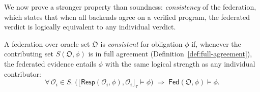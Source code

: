 \documentclass[11pt]{article}
\newcommand{\Oracle}{\mathcal{O}}            %
\newcommand{\OrcSet}{\mathfrak{O}}           %
\newcommand{\Orcl}[1]{\Oracle_{#1}}         %
\newcommand{\Fed}{\mathsf{Fed}}             %
\newcommand{\Ceil}[1]{\lfloor #1 \rfloor_{\tau}}   %
\newcommand{\Resp}{\mathsf{Resp}}           %
\begin{document}
We now prove a stronger property than soundness: \emph{consistency} of
the federation, which states that when all backends agree on a verified
program, the federated verdict is logically equivalent to any individual
verdict.

\begin{definition}\label{def:fed-consistency}
  A federation over oracle set $\OrcSet$ is \emph{consistent} for
  obligation $\phi$ if, whenever the contributing set $S(\OrcSet, \phi)$
  is in full agreement (Definition~\ref{def:full-agreement}), the
  federated evidence entails $\phi$ with the same logical strength as
  any individual contributor:
  \[
    \forall\, \Orcl{i} \in S.\;
    \bigl(\Ceil{\Resp(\Orcl{i},\phi),\Orcl{i}} \models \phi\bigr)
    \;\Longrightarrow\;
    \Fed(\OrcSet,\phi) \models \phi.
  \]
\end{definition}
\end{document}
